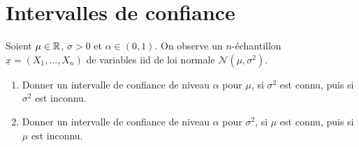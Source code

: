 \section{Intervalles de confiance}
Soient $\mu\in \mathbb R$, $\sigma>0$ et $\alpha\in (0,1)$.
On observe un $n$-échantillon $\underline x=(X_1,...,X_n)$ de variables iid de loi normale $\mathcal N(\mu ,\sigma^2)$.
\begin{enumerate}
\item Donner un intervalle de confiance de niveau $\alpha$ pour $\mu$, si $\sigma^2$ est connu, puis si $\sigma^2$ est inconnu.
\item Donner un intervalle de confiance de niveau $\alpha$ pour $\sigma^2$, si $\mu$ est connu, puis si $\mu$ est inconnu.
\end{enumerate}
